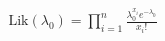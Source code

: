 \documentclass[preview]{standalone}
\begin{document}
\begin{align*}
\text{Lik}(\lambda_0) = \prod_{i=1}^n \frac{\lambda_0^{x_i} e^{-\lambda_0}}{x_i!}
\end{align*}
\end{document}
